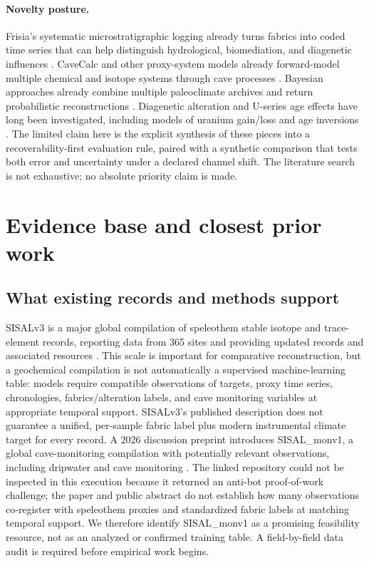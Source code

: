 \documentclass[11pt,a4paper]{article}
\begin{document}
\paragraph{Novelty posture.} Frisia's systematic microstratigraphic logging already turns fabrics into coded time series that can help distinguish hydrological, biomediation, and diagenetic influences \citep{Frisia2015}. CaveCalc and other proxy-system models already forward-model multiple chemical and isotope systems through cave processes \citep{CaveCalc2018}. Bayesian approaches already combine multiple paleoclimate archives and return probabilistic reconstructions \citep{Cahill2023}. Diagenetic alteration and U-series age effects have long been investigated, including models of uranium gain/loss and age inversions \citep{Scholz2014}. The limited claim here is the explicit synthesis of these pieces into a recoverability-first evaluation rule, paired with a synthetic comparison that tests both error and uncertainty under a declared channel shift. The literature search is not exhaustive; no absolute priority claim is made.

\section{Evidence base and closest prior work}
\subsection{What existing records and methods support}
SISALv3 is a major global compilation of speleothem stable isotope and trace-element records, reporting data from 365 sites and providing updated records and associated resources \citep{Kaushal2024SISALv3}. This scale is important for comparative reconstruction, but a geochemical compilation is not automatically a supervised machine-learning table: models require compatible observations of targets, proxy time series, chronologies, fabrics/alteration labels, and cave monitoring variables at appropriate temporal support. SISALv3's published description does not guarantee a unified, per-sample fabric label plus modern instrumental climate target for every record. A 2026 discussion preprint introduces SISAL\_monv1, a global cave-monitoring compilation with potentially relevant observations, including dripwater and cave monitoring \citep{Treble2026SISALMon}. The linked repository could not be inspected in this execution because it returned an anti-bot proof-of-work challenge; the paper and public abstract do not establish how many observations co-register with speleothem proxies and standardized fabric labels at matching temporal support. We therefore identify SISAL\_monv1 as a promising feasibility resource, not as an analyzed or confirmed training table. A field-by-field data audit is required before empirical work begins.
\end{document}
